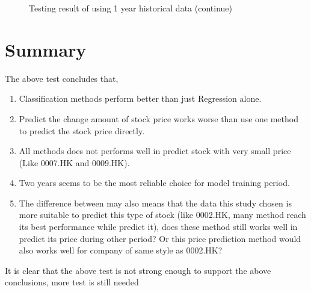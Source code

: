 \begin{figure}[h]
	\centering
	\caption{Testing result of using 1 year historical data (continue)}
	\label{fg:1yearpredict2}
\end{figure}

\section{Summary}
The above test concludes that,
\begin{enumerate}
	\item Classification methods perform better than just Regression alone.
	\item Predict the change amount of stock price works worse than use one method to predict the stock price directly.
	\item All methods does not performs well in predict stock with very small price (Like 0007.HK and 0009.HK).
	\item Two years seems to be the most reliable choice for model training period.
	\item The difference between may also means that the data this study chosen is more suitable to predict this type of stock (like 0002.HK, many method reach its best performance while predict it), does these method still works well in predict its price during other period? Or this price prediction method would also works well for company of same style as 0002.HK? 
\end{enumerate}

It is clear that the above test is not strong enough to support the above conclusions, more test is still needed

